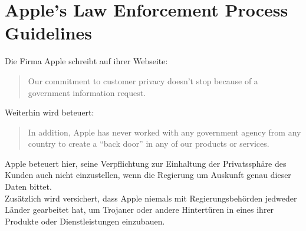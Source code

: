 \section{Apple's Law Enforcement Process Guidelines}
	Die Firma Apple schreibt auf ihrer Webseite:
	\begin{quote}
		Our commitment to customer privacy doesn't stop because of a government
		information request.\cite{AppleGovInfo2015}
	\end{quote}
	Weiterhin wird beteuert:
	\begin{quote}
		In addition, Apple has never worked with any government agency from any
		country to create a "`back door"' in any of our products or
		services.\cite{AppleGovInfo2015}
	\end{quote}
	Apple beteuert hier, seine Verpflichtung zur Einhaltung der Privatssphäre des
	Kunden auch nicht einzustellen, wenn die Regierung um Auskunft genau dieser
	Daten bittet.\\
	Zusätzlich wird versichert, dass Apple niemals mit Regierungsbehörden
	jedweder Länder gearbeitet hat, um Trojaner oder andere Hintertüren in eines
	ihrer Produkte oder Dienstleistungen einzubauen.
